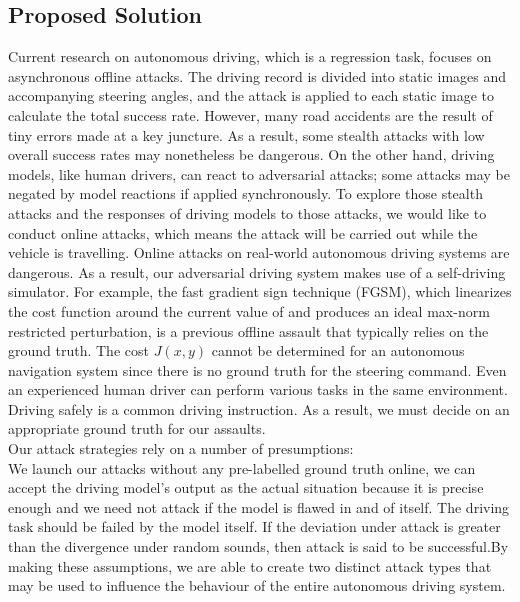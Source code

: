 \documentclass[ 12pt,a4paper,twocolumn,fleqn]{article}
\begin{document}
\subsection{Proposed Solution}
Current research on autonomous driving, which is a regression task, focuses on asynchronous offline attacks. The driving record is divided into static images and accompanying steering angles, and the attack is applied to each static image to calculate the total success rate. However, many road accidents are the result of tiny errors made at a key juncture. As a result, some stealth attacks with low overall success rates may nonetheless be dangerous. On the other hand, driving models, like human drivers, can react to adversarial attacks; some attacks may be negated by model reactions if applied synchronously. To explore those stealth attacks and the responses of driving models to those attacks, we would like to conduct online attacks, which means the attack will be carried out while the vehicle is travelling. Online attacks on real-world autonomous driving systems are dangerous. As a result, our adversarial driving system makes use of a self-driving simulator. For example, the fast gradient sign technique (FGSM), which linearizes the cost function around the current value of and produces an ideal max-norm restricted perturbation, is a previous offline assault that typically relies on the ground truth. The cost $J(x, y)$ cannot be determined for an autonomous navigation system since there is no ground truth for the steering command. Even an experienced human driver can perform various tasks in the same environment. Driving safely is a common driving instruction. As a result, we must decide on an appropriate ground truth for our assaults. \\
%
Our attack strategies rely on a number of presumptions:\\
%
We launch our attacks without any pre-labelled ground truth online, we can accept the driving model's output as the actual situation because it is precise enough and we need not attack if the model is flawed in and of itself. The driving task should be failed by the model itself. If the deviation under attack is greater than the divergence under random sounds, then attack is said to be successful.By making these assumptions, we are able to create two distinct attack types that may be used to influence the behaviour of the entire autonomous driving system.\\
%
\end{document}
